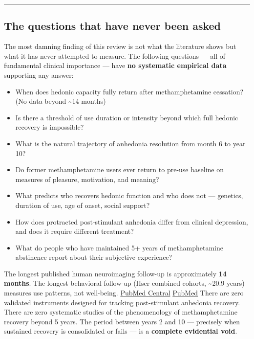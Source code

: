 \begin{center}\rule{0.5\linewidth}{0.5pt}\end{center}

\subsection{The questions that have never been asked}\label{14_what_we_dont_know-the-questions-that-have-never-been-asked}

The most damning finding of this review is not what the literature shows but what it has never attempted to measure. The following questions --- all of fundamental clinical importance --- have \textbf{no systematic empirical data} supporting any answer:

\begin{itemize}
\tightlist
\item
  When does hedonic capacity fully return after methamphetamine cessation? (No data beyond \textasciitilde14 months)
\item
  Is there a threshold of use duration or intensity beyond which full hedonic recovery is impossible?
\item
  What is the natural trajectory of anhedonia resolution from month 6 to year 10?
\item
  Do former methamphetamine users ever return to pre-use baseline on measures of pleasure, motivation, and meaning?
\item
  What predicts who recovers hedonic function and who does not --- genetics, duration of use, age of onset, social support?
\item
  How does protracted post-stimulant anhedonia differ from clinical depression, and does it require different treatment?
\item
  What do people who have maintained 5+ years of methamphetamine abstinence report about their subjective experience?
\end{itemize}

The longest published human neuroimaging follow-up is approximately \textbf{14 months}. The longest behavioral follow-up (Hser combined cohorts, \textasciitilde20.9 years) measures use patterns, not well-being. \href{https://pmc.ncbi.nlm.nih.gov/articles/PMC4072125/}{PubMed Central} \href{https://pubmed.ncbi.nlm.nih.gov/24837584/}{PubMed} There are zero validated instruments designed for tracking post-stimulant anhedonia recovery. There are zero systematic studies of the phenomenology of methamphetamine recovery beyond 5 years. The period between years 2 and 10 --- precisely when sustained recovery is consolidated or fails --- is a \textbf{complete evidential void}.

